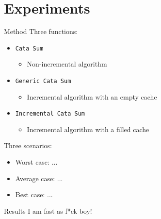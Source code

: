 \section{Experiments}

\begin{slide}{Method}
Three functions:
\begin{itemize}
  \item \texttt{Cata Sum} 
  \begin{itemize}
    \item Non-incremental algorithm
  \end{itemize}
  \item \texttt{Generic Cata Sum}
  \begin{itemize}
    \item Incremental algorithm with an empty cache
  \end{itemize}
  \item \texttt{Incremental Cata Sum}
  \begin{itemize}
    \item Incremental algorithm with a filled cache
  \end{itemize}
\end{itemize}

Three scenarios:
\begin{itemize}
  \item Worst case: ...
  \item Average case: ...
  \item Best case: ...
\end{itemize}

\end{slide}

\begin{slide}{Results}
I am fast as f*ck boy!
\end{slide}